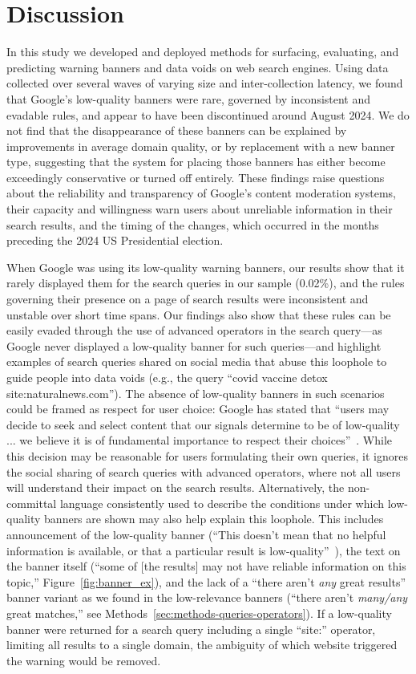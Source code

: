 \section{Discussion}
\label{sec:discussion}

In this study we developed and deployed methods for surfacing, evaluating, and predicting warning banners and data voids on web search engines.
Using data collected over several waves of varying size and inter-collection latency, we found that Google's low-quality banners were rare, governed by inconsistent and evadable rules, 
and appear to have been discontinued around August 2024.
We do not find that the disappearance of these banners can be explained by improvements in average domain quality, or by replacement with a new banner type, suggesting that the system for placing those banners has either become exceedingly conservative or turned off entirely.
These findings raise questions about the reliability and transparency
of Google's content moderation systems, their capacity and willingness warn users about unreliable information in their search results, and the timing of the changes, which occurred in the months preceding the 2024 US Presidential election.

When Google was using its low-quality warning banners, our results show that it rarely displayed them for the search queries in our sample (0.02\%), and the rules governing their presence on a page of search results were inconsistent and unstable over short time spans.
Our findings also show that these rules can be easily evaded through the use of advanced operators in the search query---as Google never displayed a low-quality banner for such queries---and highlight examples of search queries shared on social media that abuse this loophole to guide people into data voids (e.g., the query ``covid vaccine detox site:naturalnews.com'').
The absence of low-quality banners in such scenarios could be framed as respect for user choice: Google has stated that ``users may decide to seek and select content that our signals determine to be of low-quality ... we believe it is of fundamental importance to respect their choices''~\citep{google2024information}.
While this decision may be reasonable for users formulating their own queries, it ignores the social sharing of search queries with advanced operators, where not all users will understand their impact on the search results.
Alternatively, the non-committal language consistently used to describe the conditions under which low-quality banners are shown may also help explain this loophole.
This includes announcement of the low-quality banner (``This doesn't mean that no helpful information is available, or that a particular result is low-quality''~\cite{nayak2022new}), the text on the banner itself (``some of [the results] may not have reliable information on this topic,'' Figure~\ref{fig:banner_ex}), and the lack of a ``there aren't \textit{any} great results'' banner variant as we found in the low-relevance banners (``there aren't \textit{many/any} great matches,'' see Methods~\ref{sec:methods-queries-operators}).
If a low-quality banner were returned for a search query including a single ``site:'' operator, limiting all results to a single domain, the ambiguity of which website triggered the warning would be removed.


